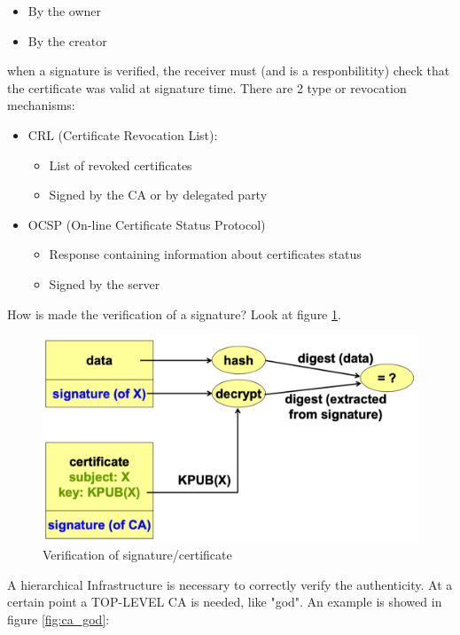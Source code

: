 \documentclass[12pt]{article}
\begin{document}
\begin{itemize}
  \item By the owner
  \item By the creator
\end{itemize}
when a signature is verified, the receiver must (and is a responbilitity) check that the certificate was valid at signature time. There are 2 type or revocation mechanisms:
\begin{itemize}
  \item CRL (Certificate Revocation List):
  \begin{itemize}
    \item List of revoked certificates
    \item Signed by the CA or by delegated party
  \end{itemize}
  \item OCSP (On-line Certificate Status Protocol)
  \begin{itemize}
    \item Response containing information about certificates status
    \item Signed by the server
  \end{itemize}
\end{itemize}
How is made the verification of a signature? Look at figure \ref{fig:very_sign}.
\begin{figure}[H]
   \centering
   \includegraphics[width=\linewidth]{images/very_sign.png}
   \caption{Verification of signature/certificate}
   \label{fig:very_sign}
\end{figure}
A hierarchical Infrastructure is necessary to correctly verify the authenticity. At a certain point a TOP-LEVEL CA is needed, like "god". An example is showed in figure \ref{fig:ca_god}:
\end{document}
